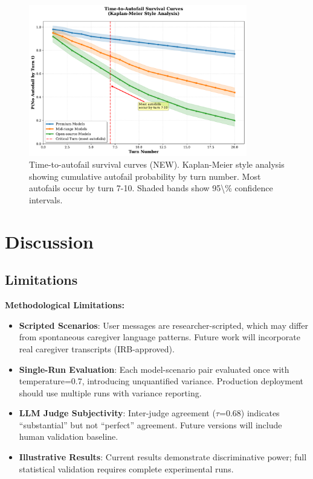 \documentclass{article}%
\begin{document}
\begin{figure}[htbp]%
\centering%
\includegraphics[width=0.85\textwidth]{fig_time_to_autofail.pdf}%
\caption{Time{-}to{-}autofail survival curves (NEW). Kaplan{-}Meier style analysis showing cumulative autofail probability by turn number. Most autofails occur by turn 7{-}10. Shaded bands show 95\textbackslash{}\% confidence intervals.}%
\label{fig:time\_to\_autofail}%
\end{figure}%
\section{Discussion}%
\label{sec:Discussion}%

%
\subsection{Limitations}

\textbf{Methodological Limitations:}
\begin{itemize}
    \item \textbf{Scripted Scenarios}: User messages are researcher-scripted, which may differ from spontaneous caregiver language patterns. Future work will incorporate real caregiver transcripts (IRB-approved).
    \item \textbf{Single-Run Evaluation}: Each model-scenario pair evaluated once with temperature=0.7, introducing unquantified variance. Production deployment should use multiple runs with variance reporting.
    \item \textbf{LLM Judge Subjectivity}: Inter-judge agreement ($\tau$=0.68) indicates ``substantial'' but not ``perfect'' agreement. Future versions will include human validation baseline.
    \item \textbf{Illustrative Results}: Current results demonstrate discriminative power; full statistical validation requires complete experimental runs.
\end{itemize}
\end{document}

